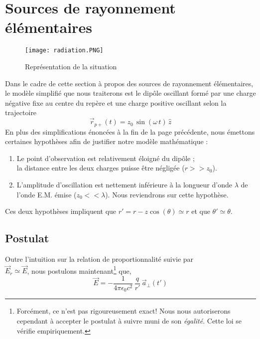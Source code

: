 \section{Sources de rayonnement élémentaires}
\begin{figure}[h]\centering
\texttt{[image: radiation.PNG]}
\caption{Représentation de la situation}
\label{fig:dipo}
\end{figure}
Dans le cadre de cette section à propos des sources de rayonnement élémentaires, le modèle simplifié que nous traiterons est le dipôle oscillant formé par une charge négative fixe au centre du repère et une charge positive oscillant selon la trajectoire $$ \vec{r}_{p+}(t) = z_{0}\,\sin (\omega\, t) \,\hat{z}$$ 
En plus des simplifications énoncées à la fin de la page précédente, nous émettons certaines hypothèses afin de justifier notre modèle mathématique :
\begin{enumerate}
\item Le point d'observation est relativement éloigné du dipôle ; \\la distance entre les deux charges puisse être négligée ($r>>z_0$). 
\item L'amplitude d'oscillation est nettement inférieure à la longueur d'onde $\lambda$ de l'onde E.M. émise ($z_0 <<\lambda$). Nous reviendrons sur cette hypothèse.
\end{enumerate}
Ces deux hypothèses impliquent que $r'=r-z\cos(\theta)\simeq r$ et que $\theta'\simeq \theta$.
\subsection{Postulat}
Outre l'intuition sur la relation de proportionnalité suivie par\\ $\vec{E}_{r} \simeq \vec{E}$, nous postulons maintenant\footnote{Forcément, ce n'est pas rigoureusement exact! Nous nous autoriserons cependant à accepter le postulat à suivre muni de son \textit{égalité}. Cette loi se vérifie empiriquement.} que,
$$ \vec{E} = -\frac{1}{4\pi\epsilon_{0}c^2} \,\frac{q}{r'}\,\vec{a}_{\perp}(t')$$

